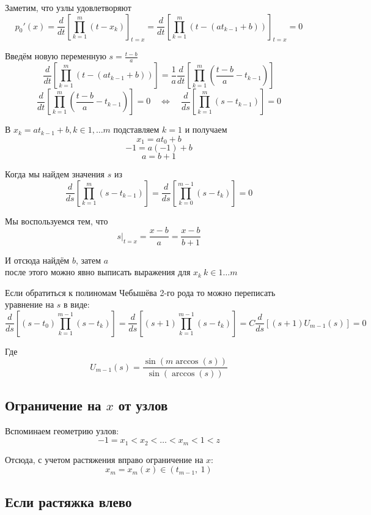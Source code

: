 \documentclass[12pt,a4paper]{article}
\begin{document}
	
	\noindent Заметим, что узлы удовлетворяют
	\[
	p_0'(x) = 
	\frac{d}{dt} \left[\prod_{k=1}^{m} (t - x_k) \right]_{t=x} = 
	\frac{d}{dt} \left[\prod_{k=1}^{m} (t - (at_{k-1} + b) ) \right]_{t=x} = 
	 0
	\]
	
	\noindent Введём новую переменную $s = \frac{t-b}{a}$
	\[
	\frac{d}{dt} \left[\prod_{k=1}^{m} (t - (at_{k-1} + b) ) \right] =
	\frac{1}{a}\frac{d}{dt} \left[\prod_{k=1}^{m} \left( \frac{t-b}{a} - t_{k-1} \right) \right] 
	\]
	\[
	\frac{d}{dt} \left[\prod_{k=1}^{m} \left( \frac{t-b}{a} - t_{k-1} \right) \right] = 0 
	\quad \Longleftrightarrow \quad
	\frac{d}{ds} \left[\prod_{k=1}^{m} \left( s - t_{k-1} \right) \right] = 0
	\]
	
	\noindent В $x_k = a t_{k-1} + b, k \in 1, \ldots m$ подставляем $k=1$ и получаем
	\[
	x_1 = a t_0 + b
	\]
	\[
	-1 = a (-1) + b
	\]
	\[
	a = b + 1
	\]
	
	\noindent Когда мы найдем значения $s$ из
	\[
	\frac{d}{ds} \left[\prod_{k=1}^{m} \left( s - t_{k-1} \right) \right] = 
	\frac{d}{ds} \left[\prod_{k=0}^{m-1} \left( s - t_{k} \right) \right] = 0
	\]
	
	\noindent Мы воспользуемся тем, что
	\[
	s |_{t=x} = \frac{x-b}{a} = \frac{x-b}{b+1}
	\]
	
	\noindent И отсюда найдём $b$, затем $a$ \\
	после этого можно явно выписать выражения для $x_k \  k \in 1 \ldots m$
	
	\noindent Если обратиться к полиномам Чебышёва 2-го рода то можно переписать уравнение на $s$ в виде:
	\[
	\frac{d}{ds} \left[ (s-t_0) \prod_{k=1}^{m-1} \left( s - t_{k} \right) \right] = 
	\frac{d}{ds} \left[ (s+1) \prod_{k=1}^{m-1} \left( s - t_{k} \right) \right] = 
	C \frac{d}{ds} \left[ (s+1) U_{m-1}(s) \right] = 0
	\]
	
	\noindent Где
	\[
	U_{m-1}(s) = \frac{\sin(m \arccos(s))}{\sin(\arccos(s))}
	\]
	
	\subsection{Ограничение на $x$ от узлов}
	
	\noindent Вспоминаем геометрию узлов:
	\[
	-1 = x_1 < x_2 < \ldots < x_m < 1 < z
	\]
	
	\noindent Отсюда, с учетом растяжения вправо ограничение на $x$:
	\[
	x_m = x_m(x) \in (t_{m-1}, \ 1)
	\]
	
	\newpage
	\subsection*{Если растяжка влево}
	
\end{document}
